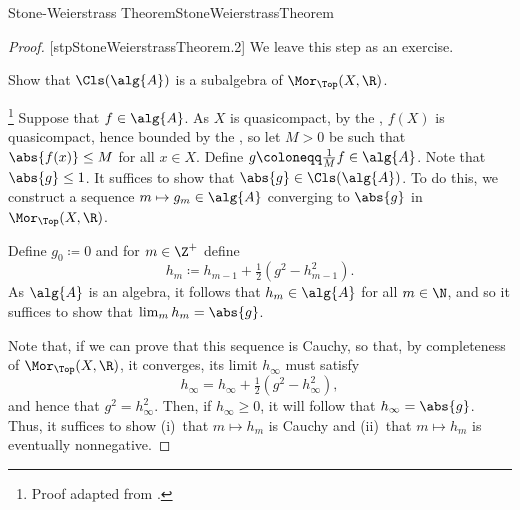 \begin{thm}{Stone-Weierstrass Theorem}{StoneWeierstrassTheorem}
\begin{proof}
[stpStoneWeierstrassTheorem.2]
We leave this step as an exercise.
\begin{exr}[breakable=false]{}{}
Show that $\Cls (\alg{A})$ is a subalgebra of $\Mor _{\Top}(X,\R )$.
\end{exr}

\footnote{Proof adapted from \cite[Theorem 3.3.8]{Sally}.}
Suppose that $f\in \alg{A}$.  As $X$ is quasicompact, by the , $f(X)$ is quasicompact, hence bounded by the , so let $M>0$ be such that $\abs{f(x)}\leq M$ for all $x\in X$.  Define $g\coloneqq \frac{1}{M}f\in \alg{A}$.  Note that $\abs{g}\leq 1$.  It suffices to show that $\abs{g}\in \Cls (\alg{A})$.  To do this, we construct a sequence $m\mapsto g_m\in \alg{A}$ converging to $\abs{g}$ in $\Mor _{\Top}(X,\R )$.

Define $g_0\coloneqq 0$ and for $m\in \Z ^+$ define
\begin{equation}\label{eqn4.4.25}
h_m\coloneqq h_{m-1}+\tfrac{1}{2}(g^2-h_{m-1}^2).
\end{equation}
As $\alg{A}$ is an algebra, it follows that $h_m\in \alg{A}$ for all $m\in \N$, and so it suffices to show that $\lim _mh_m=\abs{g}$.

Note that, if we can prove that this sequence is Cauchy, so that, by completeness of $\Mor _{\Top}(X,\R )$, it converges, its limit $h_{\infty}$ must satisfy
\begin{equation}
h_{\infty}=h_{\infty}+\tfrac{1}{2}(g^2-h_{\infty}^2),
\end{equation}
and hence that $g^2=h_{\infty}^2$.  Then, if $h_{\infty}\geq 0$, it will follow that $h_{\infty}=\abs{g}$.  Thus, it suffices to show (i)~that $m\mapsto h_m$ is Cauchy and (ii)~that $m\mapsto h_m$ is eventually nonnegative.


\end{proof}
\end{thm}
